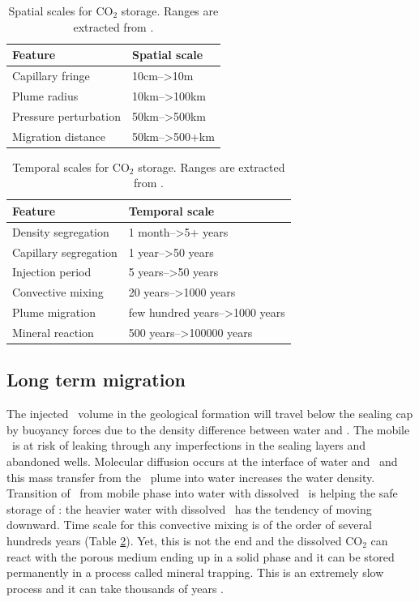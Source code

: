\begin{table}[tbf]
  \center
  \caption{Spatial scales for $\mbox{CO}_2$ storage. Ranges are extracted from
  \cite{celia2011geological}.}
  \begin{tabular}{ |l|l| }
    \hline
    Feature& Spatial scale \\
    \hline
    Capillary fringe & 10cm-->10m\\
    \hline
    Plume radius & 10km-->100km\\
    \hline
    Pressure perturbation & 50km-->500km\\
    \hline
    Migration distance & 50km-->500+km\\
    \hline
  \end{tabular}
  \label{tab:xscl}
\end{table}

\begin{table}
\center
  \caption{Temporal scales for $\mbox{CO}_2$ storage. Ranges are extracted from
\cite{celia2011geological,gunter1997aquifer}.}
\begin{tabular}{ |l|l| }
    \hline
    Feature& Temporal scale \\
    \hline
    Density segregation & 1 month-->5+ years\\
    \hline
    Capillary segregation & 1 year-->50 years\\
    \hline
    Injection period & 5 years-->50 years\\
    \hline
    Convective mixing & 20 years-->1000 years\\
    \hline
    Plume migration & few hundred years-->1000 years\\
    \hline
    Mineral reaction & 500 years-->100000 years \\
    \hline
  \end{tabular}
  \label{tab:tscl}
\end{table}

\subsection{Long term migration}

The injected \coo\ volume in the geological formation will travel below
the sealing cap by buoyancy forces due to the density difference between water
and \coo. The mobile \coo\ is at risk of leaking through any imperfections in the sealing
layers and abandoned wells. Molecular diffusion occurs at the interface of water
and \coo\ and this mass transfer from the \coo\ plume into water
increases the water density. Transition of \coo\ from mobile phase
into water with dissolved \coo\ is helping the safe storage of
\coo: the heavier water with dissolved \coo\ has the tendency
of moving downward. Time scale for this convective mixing is of the order of
several hundreds years (Table \ref{tab:tscl}). Yet, this is not the end and   the
dissolved $\mbox{CO}_2$ can react with the porous medium ending up in a solid
phase and it can be stored permanently in a process called mineral trapping.
This is an 
extremely slow process and it can take thousands of years
\cite{gunter1997aquifer}.


